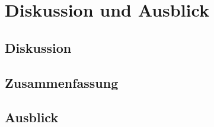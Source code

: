 \chapter{Diskussion und Ausblick}
\label{chap:intro}
\chapterstart
\section{Diskussion}
\section{Zusammenfassung}
\section{Ausblick}
\chapterend
